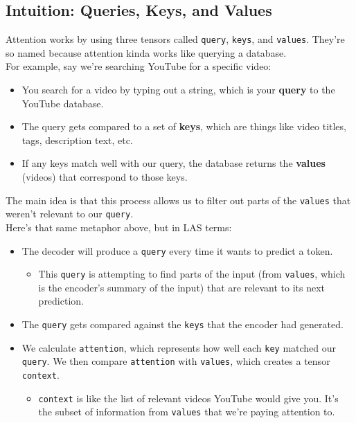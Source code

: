 \documentclass{article}
\newcommand{\ttt}[1]{\texttt{#1}}
\begin{document}
\subsection{Intuition: Queries, Keys, and Values}

Attention works by using three tensors called \ttt{query}, \ttt{keys}, and \ttt{values}. They're so named because attention kinda works like querying a database. \\ 

For example, say we're searching YouTube for a specific video:

\begin{itemize}
    \item You search for a video by typing out a string, which is your \textbf{query} to the YouTube database.
    \item The query gets compared to a set of \textbf{keys}, which are things like video titles, tags, description text, etc.
    \item If any keys match well with our query, the database returns the \textbf{values} (videos) that correspond to those keys.
\end{itemize}

The main idea is that this process allows us to filter out parts of the \ttt{values} that weren't relevant to our \ttt{query}. \\

Here's that same metaphor above, but in LAS terms:

\begin{itemize}
    \item The decoder will produce a \ttt{query} every time it wants to predict a token.
    \begin{itemize}
        \item This \ttt{query} is attempting to find parts of the input (from \ttt{values}, which is the encoder's summary of the input) that are relevant to its next prediction.
    \end{itemize}
    \item The \ttt{query} gets compared against the \ttt{keys} that the encoder had generated.
    \item We calculate \ttt{attention}, which represents how well each \ttt{key} matched our \ttt{query}. We then compare \ttt{attention} with \ttt{values}, which creates a tensor \ttt{context}.
    \begin{itemize}
        \item \ttt{context} is like the list of relevant videos YouTube would give you. It's the subset of information from \ttt{values} that we're paying attention to.
    \end{itemize}
\end{itemize}
\end{document}
